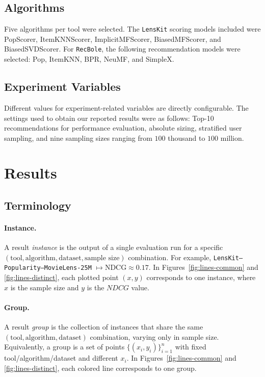 \documentclass[sigconf,nonacm]{acmart}
\begin{document}
\subsection{Algorithms}
Five algorithms per tool were selected. The \texttt{LensKit} scoring models included were PopScorer, ItemKNNScorer, ImplicitMFScorer, BiasedMFScorer, and BiasedSVDScorer. For \texttt{RecBole}, the following recommendation models were selected: Pop, ItemKNN, BPR, NeuMF, and SimpleX.

\subsection{Experiment Variables}
Different values for experiment-related variables are directly configurable. The settings used to obtain our reported results were as follows: Top-10 recommendations for performance evaluation, absolute sizing, stratified user sampling, and nine sampling sizes ranging from $100$ thousand to $100$ million.

\section{Results}
\subsection{Terminology}
\paragraph{Instance.}
A result \emph{instance} is the output of a single evaluation run for a specific
$(\text{tool}, \text{algorithm}, \text{dataset}, \text{sample size})$ combination.
For example, \texttt{LensKit--Popularity--MovieLens-25M} $\mapsto \mathrm{NDCG} \approx 0.17$.
In Figures~\ref{fig:lines-common} and \ref{fig:lines-distinct}, each plotted point $(x,y)$ corresponds to one instance, where
$x$ is the sample size and $y$ is the $NDCG$ value.

\paragraph{Group.}
A result \emph{group} is the collection of instances that share the same
$(\text{tool}, \text{algorithm}, \text{dataset})$ combination, varying only in sample size.
Equivalently, a group is a set of points $\{(x_i, y_i)\}_{i=1}^n$ with fixed
tool/algorithm/dataset and different $x_i$.
In Figures~\ref{fig:lines-common} and \ref{fig:lines-distinct}, each colored line corresponds to one group.
\end{document}
